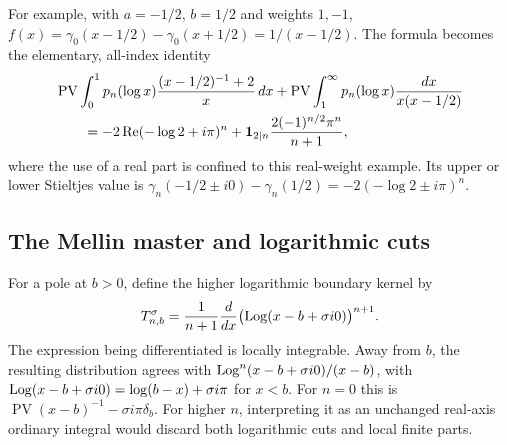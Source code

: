 For example, with $a=-1/2$, $b=1/2$ and weights $1,-1$,
$f(x)=\gamma_0(x-1/2)-\gamma_0(x+1/2)=1/(x-1/2)$.
The formula becomes the elementary, all-index identity
\begin{align}
 &\operatorname{PV}\int_0^1p_n(\log x)
     \frac{(x-1/2)^{-1}+2}{x}\,dx
 +\operatorname{PV}\int_1^\infty
        p_n(\log x)\frac{dx}{x(x-1/2)}\notag\\
 &\qquad=-2\operatorname{Re}(-\log2+i\pi)^n
   +\mathbf1_{2\mid n}\frac{2(-1)^{n/2}\pi^n}{n+1},
 \label{stcut:half-example}
\end{align}
where the use of a real part is confined to this real-weight example.
Its upper or lower Stieltjes value is
$\gamma_n(-1/2\pm i0)-\gamma_n(1/2)
=-2(-\log2\pm i\pi)^n$.

\subsection{The Mellin master and logarithmic cuts}
For a pole at $b>0$, define the higher logarithmic boundary kernel by
\begin{equation}\label{stcut:log-boundary}
 T_{n,b}^{\sigma}
 =\frac1{n+1}\frac{d}{dx}
      \bigl(\operatorname{Log}(x-b+\sigma i0)\bigr)^{n+1}.
\end{equation}
The expression being differentiated is locally integrable. Away from
$b$, the resulting distribution agrees with
$\operatorname{Log}^n(x-b+\sigma i0)/(x-b)$, with
$\operatorname{Log}(x-b+\sigma i0)=\log(b-x)+\sigma i\pi$ for $x<b$.
For $n=0$ this is $\operatorname{PV}(x-b)^{-1}-\sigma i\pi\delta_b$.
For higher $n$, interpreting it as an unchanged real-axis ordinary
integral would discard both logarithmic cuts and local finite parts.

